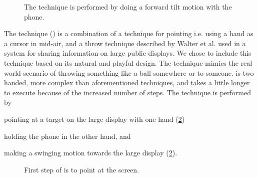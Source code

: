 \begin{figure}[H]
\caption{
	\protect{} The \tilt technique is performed by doing a forward tilt motion with the phone.
}
\label{fig:tiltTechnique}
\end{figure}

The \throw technique () is a combination of a technique for pointing \cite{Scheible:2008} i.e. using a hand as a cursor in mid-air, and a throw technique described by Walter et al. \cite{Walter:2014} used in a system for sharing information on large public displays.
We chose to include this technique based on its natural and playful design.
The technique mimics the real world scenario of throwing something like a ball somewhere or to someone.
\throw is two handed, more complex than aforementioned techniques, and takes a little longer to execute because of the increased number of steps.
The \throw technique is performed by 
\begin{enumerate*}[label=\itshape\roman*\upshape)]
	\item{pointing at a target on the large display with one hand (\cref{fig:throwTechnique})} 
	\item{holding the phone in the other hand, and}
	\item{making a swinging motion towards the large display (\cref{fig:throwTechnique}).}
\end{enumerate*}

\begin{figure}[H]
\caption{
	\protect{} First step of \throw is to point at the screen.
}
\label{fig:throwTechnique}
\end{figure}

